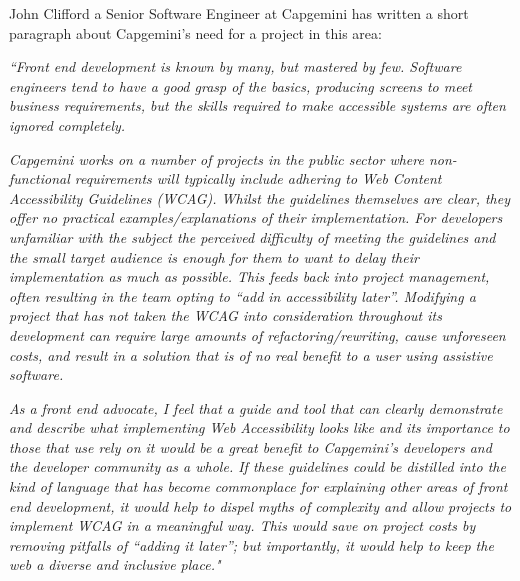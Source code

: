 John Clifford a Senior Software Engineer at Capgemini has written a short
paragraph about Capgemini's need for a project in this area:
\begin{center}
\textit{
``Front end development is known by many, but mastered by few. Software
engineers tend to have a good grasp of the basics, producing screens to meet
business requirements, but the skills required to make accessible systems are
often ignored completely.}

\textit{
Capgemini works on a number of projects in the public sector where
non-functional requirements will typically include adhering to Web Content
Accessibility Guidelines (WCAG). Whilst the guidelines themselves are clear,
they offer no practical examples/explanations of their implementation. For
developers unfamiliar with the subject the perceived difficulty of meeting the
guidelines and the small target audience is enough for them to want to delay
their implementation as much as possible. This feeds back into project
management, often resulting in the team opting to “add in accessibility later”.
Modifying a project that has not taken the WCAG into consideration throughout
its development can require large amounts of refactoring/rewriting, cause
unforeseen costs, and result in a solution that is of no real benefit to a user
using assistive software.}

\textit{
As a front end advocate, I feel that a guide and tool that can clearly
demonstrate and describe what implementing Web Accessibility looks like and its
importance to those that use rely on it would be a great benefit to Capgemini’s
developers and the developer community as a whole. If these guidelines could
be distilled into the kind of language that has become commonplace for
explaining other areas of front end development, it would help to dispel
myths of complexity and allow projects to implement WCAG in a meaningful way.
This would save on project costs by removing pitfalls of “adding it later”; but
importantly, it would help to keep the web a diverse and inclusive place."}
\end{center}

